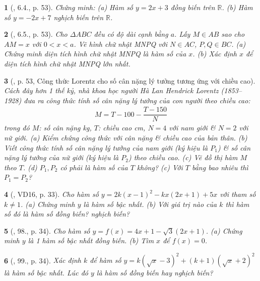 \documentclass{article}
\newtheorem{baitoan}{}
\begin{document}
\begin{baitoan}[\cite{Binh_boi_duong_Toan_9_tap_1}, 6.4., p. 53]
	Chứng minh: (a) Hàm số $y = 2x + 3$ đồng biến trên $\mathbb{R}$. (b) Hàm số $y = -2x + 7$ nghịch biến trên $\mathbb{R}$.
\end{baitoan}

\begin{baitoan}[\cite{Binh_boi_duong_Toan_9_tap_1}, 6.5., p. 53]
	Cho $\Delta ABC$ đều có độ dài cạnh bằng $a$. Lấy $M\in AB$ sao cho $AM = x$ với $0 < x < a$. Vẽ hình chữ nhật MNPQ với $N\in AC$, $P,Q\in BC$. (a) Chứng minh diện tích hình chữ nhật MNPQ là hàm số của $x$. (b) Xác định $x$ để diện tích hình chữ nhật MNPQ lớn nhất.
\end{baitoan}

\begin{baitoan}[\cite{Binh_boi_duong_Toan_9_tap_1},  p. 53, Công thức Lorentz cho số cân nặng lý tưởng tương ứng với chiều cao]
	Cách đây hơn 1 thế kỷ, nhà khoa học người Hà Lan Hendrick Lorentz (1853--1928) đưa ra công thức tính số cân nặng lý tưởng của con người theo chiều cao:
	\begin{align*}
		\boxed{M = T - 100 - \dfrac{T - 150}{N}}
	\end{align*}
	trong đó $M$: số cân nặng {\rm kg}, $T$: chiều cao {\rm cm}, $N = 4$ với nam giới \& $N = 2$ với nữ giới. (a) Kiểm chứng công thức với cân nặng \& chiều cao của bản thân. (b) Viết công thức tính số cân nặng lý  tưởng của nam giới (ký hiệu là $P_1$) \& số cân nặng lý tưởng của nữ giới (ký hiệu là $P_2$) theo chiều cao. (c) Vẽ đồ thị hàm $M$ theo $T$. (d) $P_1,P_2$ có phải là hàm số của $T$ không? (c) Với $T$ bằng bao nhiêu thì $P_1 = P_2$?
\end{baitoan}

\begin{baitoan}[\cite{Tuyen_Toan_9_old}, VD16, p. 33]
	Cho hàm số $y = 2k(x - 1)^2 - kx(2x + 1) + 5x$ với tham số $k\ne1$. (a) Chứng minh $y$ là hàm số bậc nhất. (b) Với giá trị nào của $k$ thì hàm số đó là hàm số đồng biến? nghịch biến?
\end{baitoan}

\begin{baitoan}[\cite{Tuyen_Toan_9_old}, 98., p. 34]
	Cho hàm số $y = f(x) = 4x + 1 - \sqrt{3}(2x + 1)$. (a) Chứng minh $y$ là 1 hàm số bậc nhất đồng biến. (b) Tìm $x$ để $f(x) = 0$.
\end{baitoan}

\begin{baitoan}[\cite{Tuyen_Toan_9_old}, 99., p. 34]
	Xác định $k$ để hàm số $y = k(\sqrt{x} - 3)^2 + (k + 1)(\sqrt{x} + 2)^2$ là hàm số bậc nhất. Lúc đó $y$ là hàm số đồng biến hay nghịch biến?
\end{baitoan}
\end{document}
